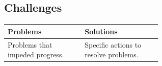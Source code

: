 \documentclass[compsoc,draftclsnofoot,onecolumn,10pt]{IEEEtran}
\begin{document}
\subsection{Challenges}

\begin{tabular}{|p{0.3\linewidth}|p{0.3\linewidth}|}
	\hline
	\textbf{Problems} & \textbf{Solutions}\\
	\hline	
	Problems that impeded progress. & Specific actions to resolve problems.\\
	\hline
	
\end{tabular}
\end{document}
